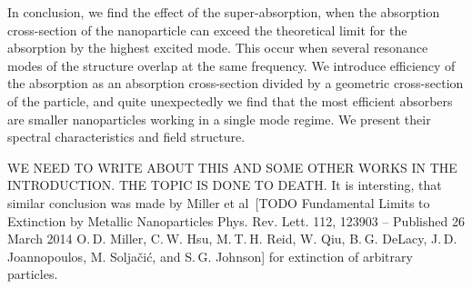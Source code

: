 \documentclass[aps,prl,twocolumn,showpacs,superscriptaddress,groupedaddress]{revtex4-1}
\begin{document}

In conclusion, we find the effect of the super-absorption, when the
absorption cross-section of the nanoparticle can exceed the
theoretical limit for the absorption by the highest excited mode. This
occur when several resonance modes of the structure overlap at the
same frequency. We introduce efficiency of the absorption as an
absorption cross-section divided by a geometric cross-section of the
particle, and quite unexpectedly we find that the most efficient
absorbers are smaller nanoparticles working in a single mode
regime. We present their spectral characteristics and field structure.


WE NEED TO WRITE ABOUT THIS AND SOME OTHER WORKS IN THE
INTRODUCTION. THE TOPIC IS DONE TO DEATH. It is intersting, that
similar conclusion was made by Miller et al~[TODO Fundamental Limits
to Extinction by Metallic Nanoparticles Phys. Rev. Lett. 112, 123903 –
Published 26 March 2014 O. D. Miller, C. W. Hsu, M. T. H. Reid,
W. Qiu, B. G. DeLacy, J. D. Joannopoulos, M. Soljačić, and
S. G. Johnson] for extinction of arbitrary particles.



\end{document}
